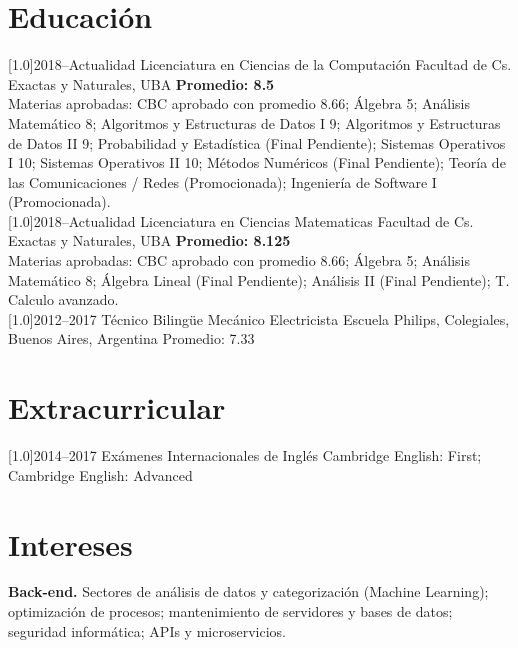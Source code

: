 \documentclass[espanol]{cv-style}     %
\begin{document}
\section{Educación}
  \vspace{-0.2cm}
\begin{entrylist}
\entry
{\scalebox{.8}[1.0]{2018--Actualidad}}
{Licenciatura en Ciencias de la Computación}
{Facultad de Cs. Exactas y Naturales, UBA}
{\textbf{Promedio: 8.5}\\
\small{Materias aprobadas: CBC aprobado con promedio 8.66; Álgebra 5; Análisis Matemático 8; Algoritmos y Estructuras de Datos I 9; Algoritmos y Estructuras de Datos II 9; Probabilidad y Estadística (Final Pendiente); Sistemas Operativos I 10; Sistemas Operativos II 10; Métodos Numéricos (Final Pendiente); Teoría de las Comunicaciones / Redes (Promocionada); Ingeniería de Software I (Promocionada).\\
}}
\entry
{\scalebox{.8}[1.0]{2018--Actualidad}}
{Licenciatura en Ciencias Matematicas}
{Facultad de Cs. Exactas y Naturales, UBA}
{\textbf{Promedio: 8.125}\\
\small{Materias aprobadas: CBC aprobado con promedio 8.66; Álgebra 5; Análisis Matemático 8; Álgebra Lineal (Final Pendiente); Análisis II (Final Pendiente); T. Calculo avanzado.\\
}}
\entry
{\scalebox{.8}[1.0]{2012--2017}}
{Técnico Bilingüe Mecánico Electricista}
{Escuela Philips, Colegiales, Buenos Aires, Argentina}
{Promedio: 7.33}
\end{entrylist}
\section{Extracurricular}
  \vspace{-0.2cm}
\begin{entrylist}
\entry
{\scalebox{.8}[1.0]{2014--2017}}
{Exámenes Internacionales de Inglés}
{}
{Cambridge English: First; Cambridge English: Advanced}
\end{entrylist}
  \vspace{-0.2cm}
\section{Intereses}
  \vspace{-0.2cm}
\textbf{Back-end.} Sectores de análisis de datos y categorización (Machine Learning); optimización de procesos; mantenimiento de servidores y bases de datos; seguridad informática; APIs y microservicios.
\end{document}

